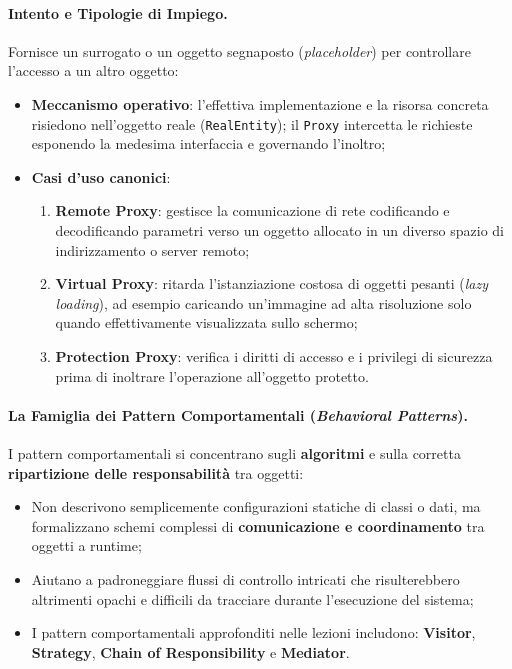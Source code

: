 \documentclass[12pt]{extarticle}
\begin{document}
\paragraph{Intento e Tipologie di Impiego.}
Fornisce un surrogato o un oggetto segnaposto (\textit{placeholder}) per controllare l'accesso a un altro oggetto:
\begin{itemize}
    \item \textbf{Meccanismo operativo}: l'effettiva implementazione e la risorsa concreta risiedono nell'oggetto reale (\texttt{RealEntity}); il \texttt{Proxy} intercetta le richieste esponendo la medesima interfaccia e governando l'inoltro;
    \item \textbf{Casi d'uso canonici}:
    \begin{enumerate}
        \item \textbf{Remote Proxy}: gestisce la comunicazione di rete codificando e decodificando parametri verso un oggetto allocato in un diverso spazio di indirizzamento o server remoto;
        \item \textbf{Virtual Proxy}: ritarda l'istanziazione costosa di oggetti pesanti (\textit{lazy loading}), ad esempio caricando un'immagine ad alta risoluzione solo quando effettivamente visualizzata sullo schermo;
        \item \textbf{Protection Proxy}: verifica i diritti di accesso e i privilegi di sicurezza prima di inoltrare l'operazione all'oggetto protetto.
    \end{enumerate}
\end{itemize}

\paragraph{La Famiglia dei Pattern Comportamentali (\textit{Behavioral Patterns}).}
I pattern comportamentali si concentrano sugli \textbf{algoritmi} e sulla corretta \textbf{ripartizione delle responsabilità} tra oggetti:
\begin{itemize}
    \item Non descrivono semplicemente configurazioni statiche di classi o dati, ma formalizzano schemi complessi di \textbf{comunicazione e coordinamento} tra oggetti a runtime;
    \item Aiutano a padroneggiare flussi di controllo intricati che risulterebbero altrimenti opachi e difficili da tracciare durante l'esecuzione del sistema;
    \item I pattern comportamentali approfonditi nelle lezioni includono: \textbf{Visitor}, \textbf{Strategy}, \textbf{Chain of Responsibility} e \textbf{Mediator}.
\end{itemize}
\end{document}
